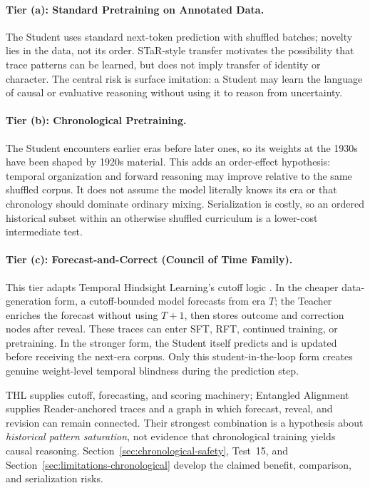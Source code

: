 \paragraph{Tier (a): Standard Pretraining on Annotated Data.} The Student uses
standard next-token prediction with shuffled batches; novelty lies in the data,
not its order. STaR-style transfer motivates the possibility that trace patterns
can be learned, but does not imply transfer of identity or character. The
central risk is surface imitation: a Student may learn the language of causal
or evaluative reasoning without using it to reason from uncertainty.

\paragraph{Tier (b): Chronological Pretraining.} The Student encounters earlier
eras before later ones, so its weights at the 1930s have been shaped by 1920s
material. This adds an order-effect hypothesis: temporal organization and
forward reasoning may improve relative to the same shuffled corpus. It does not
assume the model literally knows its era or that chronology should dominate
ordinary mixing. Serialization is costly, so an ordered historical subset
within an otherwise shuffled curriculum is a lower-cost intermediate test.

\paragraph{Tier (c): Forecast-and-Correct (Council of Time Family).} This tier
adapts Temporal Hindsight Learning's cutoff logic \cite{westerberg2026thl}. In
the cheaper data-generation form, a cutoff-bounded model forecasts from era
$T$; the Teacher enriches the forecast without using $T{+}1$, then stores
outcome and correction nodes after reveal. These traces can enter SFT, RFT,
continued training, or pretraining. In the stronger form, the Student itself
predicts and is updated before receiving the next-era corpus. Only this
student-in-the-loop form creates genuine weight-level temporal blindness during
the prediction step.

THL supplies cutoff, forecasting, and scoring machinery; Entangled Alignment
supplies Reader-anchored traces and a graph in which forecast, reveal, and
revision can remain connected. Their strongest combination is a hypothesis
about \emph{historical pattern saturation}, not evidence that chronological
training yields causal reasoning. Section~\ref{sec:chronological-safety},
Test~15, and Section~\ref{sec:limitations-chronological} develop the claimed
benefit, comparison, and serialization risks.

